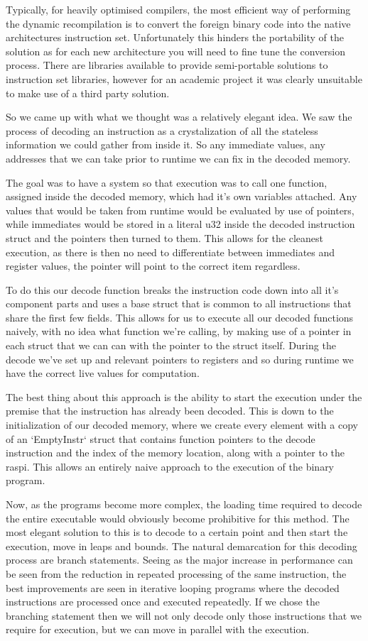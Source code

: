 \documentclass[11pt]{article}
\begin{document}
Typically, for heavily optimised compilers, the most efficient way of performing the dynamic recompilation is to convert the foreign binary code into the native architectures instruction set. Unfortunately this hinders the portability of the solution as for each new architecture you will need to fine tune the conversion process. There are libraries available to provide semi-portable solutions to instruction set libraries, however for an academic project it was clearly unsuitable to make use of a third party solution.

So we came up with what we thought was a relatively elegant idea. We saw the process of decoding an instruction as a crystalization of all the stateless information we could gather from inside it. So any immediate values, any addresses that we can take prior to runtime we can fix in the decoded memory.

The goal was to have a system so that execution was to call one function, assigned inside the decoded memory, which had it's own variables attached. Any values that would be taken from runtime would be evaluated by use of pointers, while immediates would be stored in a literal u32 inside the decoded instruction struct and the pointers then turned to them. This allows for the cleanest execution, as there is then no need to differentiate between immediates and register values, the pointer will point to the correct item regardless.

To do this our decode function breaks the instruction code down into all it's component parts and uses a base struct that is common to all instructions that share the first few fields. This allows for us to execute all our decoded functions naively, with no idea what function we're calling, by making use of a pointer in each struct that we can can with the pointer to the struct itself. During the decode we've set up and relevant pointers to registers and so during runtime we have the correct live values for computation.

The best thing about this approach is the ability to start the execution under the premise that the instruction has already been decoded. This is down to the initialization of our decoded memory, where we create every element with a copy of an `EmptyInstr` struct that contains function pointers to the decode instruction and the index of the memory location, along with a pointer to the raspi. This allows an entirely naive approach to the execution of the binary program.

Now, as the programs become more complex, the loading time required to decode the entire executable would obviously become prohibitive for this method. The most elegant solution to this is to decode to a certain point and then start the execution, move in leaps and bounds. The natural demarcation for this decoding process are branch statements. Seeing as the major increase in performance can be seen from the reduction in repeated processing of the same instruction, the best improvements are seen in iterative looping programs where the decoded instructions are processed once and executed repeatedly. If we chose the branching statement then we will not only decode only those instructions that we require for execution, but we can move in parallel with the execution.
\end{document}
